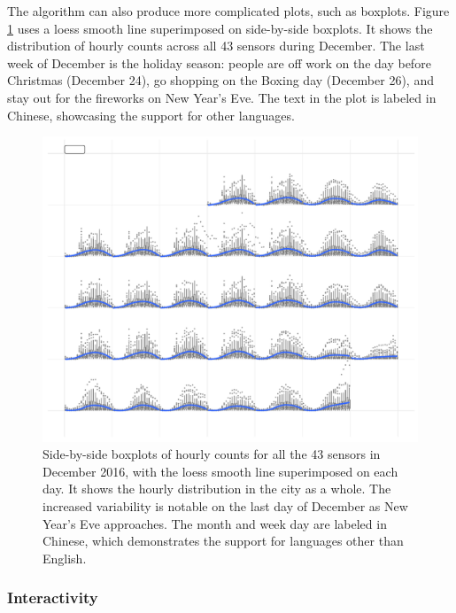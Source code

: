 \documentclass[12pt]{article}
\begin{document}
The algorithm can also produce more complicated plots, such as boxplots. Figure \ref{fig:chn} uses a loess smooth line \citep{cleveland1979loess} superimposed on side-by-side boxplots. It shows the distribution of hourly counts across all 43 sensors during December. The last week of December is the holiday season: people are off work on the day before Christmas (December 24), go shopping on the Boxing day (December 26), and stay out for the fireworks on New Year's Eve. The text in the plot is labeled in Chinese, showcasing the support for other languages.

\begin{figure}

{\centering \includegraphics[width=\textwidth]{figure/chn-1} 

}

\caption{Side-by-side boxplots of hourly counts for all the 43 sensors in December 2016, with the loess smooth line superimposed on each day. It shows the hourly distribution in the city as a whole. The increased variability is notable on the last day of December as New Year's Eve approaches. The month and week day are labeled in Chinese, which demonstrates the support for languages other than English.}\label{fig:chn}
\end{figure}



\hypertarget{interactivity}{%
\subsubsection{Interactivity}\label{interactivity}}
\end{document}
